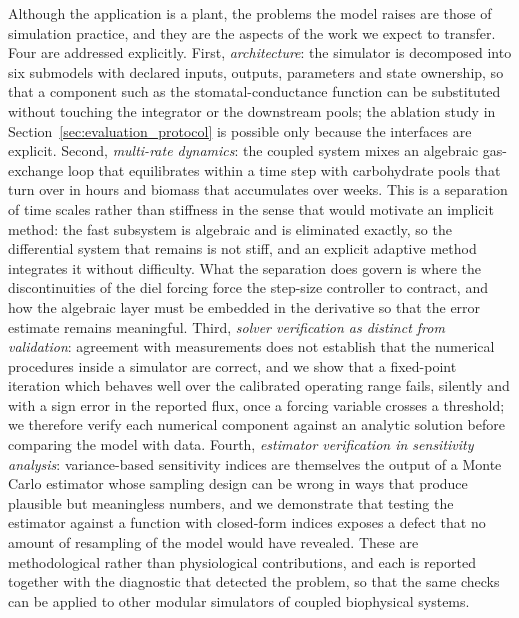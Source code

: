\documentclass[a4paper,fleqn]{cas-sc}
\begin{document}
Although the application is a plant, the problems the model raises are those of simulation practice, and they are the aspects of the work we expect to transfer. Four are addressed explicitly. First, \emph{architecture}: the simulator is decomposed into six submodels with declared inputs, outputs, parameters and state ownership, so that a component such as the stomatal-conductance function can be substituted without touching the integrator or the downstream pools; the ablation study in Section~\ref{sec:evaluation_protocol} is possible only because the interfaces are explicit. Second, \emph{multi-rate dynamics}: the coupled system mixes an algebraic gas-exchange loop that equilibrates within a time step with carbohydrate pools that turn over in hours and biomass that accumulates over weeks. This is a separation of time scales rather than stiffness in the sense that would motivate an implicit method: the fast subsystem is algebraic and is eliminated exactly, so the differential system that remains is not stiff, and an explicit adaptive method integrates it without difficulty. What the separation does govern is where the discontinuities of the diel forcing force the step-size controller to contract, and how the algebraic layer must be embedded in the derivative so that the error estimate remains meaningful. Third, \emph{solver verification as distinct from validation}: agreement with measurements does not establish that the numerical procedures inside a simulator are correct, and we show that a fixed-point iteration which behaves well over the calibrated operating range fails, silently and with a sign error in the reported flux, once a forcing variable crosses a threshold; we therefore verify each numerical component against an analytic solution before comparing the model with data. Fourth, \emph{estimator verification in sensitivity analysis}: variance-based sensitivity indices are themselves the output of a Monte Carlo estimator whose sampling design can be wrong in ways that produce plausible but meaningless numbers, and we demonstrate that testing the estimator against a function with closed-form indices exposes a defect that no amount of resampling of the model would have revealed. These are methodological rather than physiological contributions, and each is reported together with the diagnostic that detected the problem, so that the same checks can be applied to other modular simulators of coupled biophysical systems.
\end{document}
